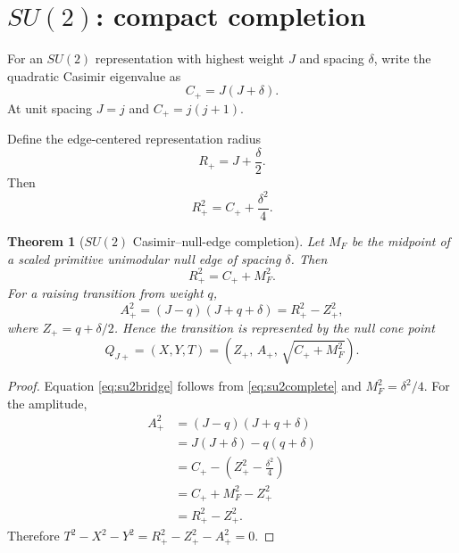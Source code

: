 \documentclass[11pt]{article}
\newtheorem{theorem}{Theorem}[section]
\theoremstyle{remark}
\begin{document}
\section{$SU(2)$: compact completion}

For an $SU(2)$ representation with highest weight $J$ and spacing $\delta$, write the quadratic Casimir eigenvalue as
\begin{equation}
C_+=J(J+\delta).
\label{eq:su2cas}
\end{equation}
At unit spacing $J=j$ and $C_+=j(j+1)$.

Define the edge-centered representation radius
\begin{equation}
R_+=J+\frac{\delta}{2}.
\label{eq:Rplus}
\end{equation}
Then
\begin{equation}
R_+^2
=
C_++\frac{\delta^2}{4}.
\label{eq:su2complete}
\end{equation}

\begin{theorem}[$SU(2)$ Casimir--null-edge completion]
\label{thm:su2}
Let $M_F$ be the midpoint of a scaled primitive unimodular null edge of spacing $\delta$.  Then
\begin{equation}
\boxed{
R_+^2=C_++M_F^2.
}
\label{eq:su2bridge}
\end{equation}
For a raising transition from weight $q$,
\begin{equation}
A_+^2
=
(J-q)(J+q+\delta)
=
R_+^2-Z_+^2,
\label{eq:su2amp}
\end{equation}
where $Z_+=q+\delta/2$.  Hence the transition is represented by the null cone point
\begin{equation}
\boxed{
Q_{J+}
=
(X,Y,T)
=
\left(
Z_+,\,
A_+,\,
\sqrt{C_++M_F^2}
\right).
}
\label{eq:su2point}
\end{equation}
\end{theorem}

\begin{proof}
Equation \eqref{eq:su2bridge} follows from \eqref{eq:su2complete} and $M_F^2=\delta^2/4$.  For the amplitude,
\begin{align*}
A_+^2
&=
(J-q)(J+q+\delta)\\
&=
J(J+\delta)-q(q+\delta)\\
&=
C_+-\left(Z_+^2-\frac{\delta^2}{4}\right)\\
&=
C_++M_F^2-Z_+^2\\
&=
R_+^2-Z_+^2.
\end{align*}
Therefore $T^2-X^2-Y^2=R_+^2-Z_+^2-A_+^2=0$.
\end{proof}
\end{document}
